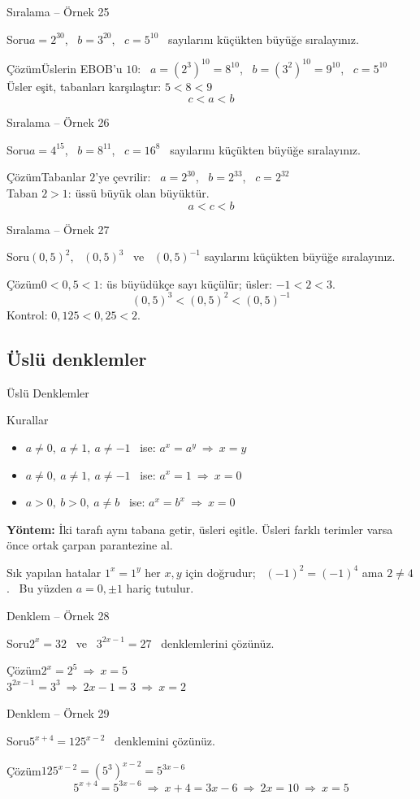 \documentclass[aspectratio=169,11pt,handout]{beamer}
\newcommand{\soru}[3]{%
\begin{frame}{#1}
  \begin{block}{Soru}\large #2\end{block}
  \pause
  \begin{exampleblock}{Çözüm}\large #3\end{exampleblock}
\end{frame}}
\begin{document}
\soru{Sıralama -- Örnek 25}
{\(a=2^{30}\), \ \(b=3^{20}\), \ \(c=5^{10}\) \ sayılarını küçükten büyüğe sıralayınız.}
{Üslerin EBOB'u \(10\): \ \(a=(2^3)^{10}=8^{10}\), \ \(b=(3^2)^{10}=9^{10}\), \ \(c=5^{10}\)\\[4pt]
Üsler eşit, tabanları karşılaştır: \(5<8<9\)
\[c<a<b\]}

\soru{Sıralama -- Örnek 26}
{\(a=4^{15}\), \ \(b=8^{11}\), \ \(c=16^{8}\) \ sayılarını küçükten büyüğe sıralayınız.}
{Tabanlar \(2\)'ye çevrilir: \ \(a=2^{30}\), \ \(b=2^{33}\), \ \(c=2^{32}\)\\[4pt]
Taban \(2>1\): üssü büyük olan büyüktür.
\[a<c<b\]}

\soru{Sıralama -- Örnek 27}
{\((0{,}5)^{2}\), \ \((0{,}5)^{3}\) \ ve \ \((0{,}5)^{-1}\) sayılarını küçükten büyüğe sıralayınız.}
{\(0<0{,}5<1\): üs büyüdükçe sayı küçülür; üsler: \(-1<2<3\).
\[(0{,}5)^{3}<(0{,}5)^{2}<(0{,}5)^{-1}\]
Kontrol: \(0{,}125<0{,}25<2\).}

\subsection{Üslü denklemler}
\begin{frame}{Üslü Denklemler}
\begin{block}{Kurallar}
\begin{itemize}
\item \(a\neq 0,\ a\neq 1,\ a\neq -1\) \ ise: \quad \(a^x=a^y\ \Rightarrow\ x=y\)
\item \(a\neq 0,\ a\neq 1,\ a\neq -1\) \ ise: \quad \(a^x=1\ \Rightarrow\ x=0\)
\item \(a>0,\ b>0,\ a\neq b\) \ ise: \quad \(a^x=b^x\ \Rightarrow\ x=0\)
\end{itemize}
\textbf{Yöntem:} İki tarafı aynı tabana getir, üsleri eşitle. Üsleri farklı terimler varsa önce ortak çarpan parantezine al.
\end{block}
\begin{alertblock}{Sık yapılan hatalar}
\(1^x=1^y\) her \(x,y\) için doğrudur; \ \((-1)^2=(-1)^4\) ama \(2\neq 4\). \ Bu yüzden \(a=0,\pm 1\) hariç tutulur.
\end{alertblock}
\end{frame}

\soru{Denklem -- Örnek 28}
{\(2^x=32\) \ ve \ \(3^{2x-1}=27\) \ denklemlerini çözünüz.}
{\(2^x=2^5\ \Rightarrow\ x=5\)\\[4pt]
\(3^{2x-1}=3^3\ \Rightarrow\ 2x-1=3\ \Rightarrow\ x=2\)}

\soru{Denklem -- Örnek 29}
{\(5^{x+4}=125^{x-2}\) \ denklemini çözünüz.}
{\(125^{x-2}=(5^3)^{x-2}=5^{3x-6}\)
\[5^{x+4}=5^{3x-6}\ \Rightarrow\ x+4=3x-6\ \Rightarrow\ 2x=10\ \Rightarrow\ x=5\]}
\end{document}
